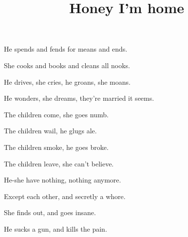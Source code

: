 \documentclass{article}
\title{Honey I'm home}
\begin{document}
 \newline

He spends and fends for means and ends.

She cooks and books and cleans all nooks.

He drives, she cries, he groans, she moans.

He wonders, she dreams, they're married it seems.

\newline
\newline

The children come, she goes numb.

The children wail, he glugs ale.

The children smoke, he goes broke.

The children leave, she can't believe.

\newline
\newline

He-she have nothing, nothing anymore.

Except each other, and secretly a whore.

She finds out, and goes insane.

He sucks a gun, and kills the pain.
\end{document}
